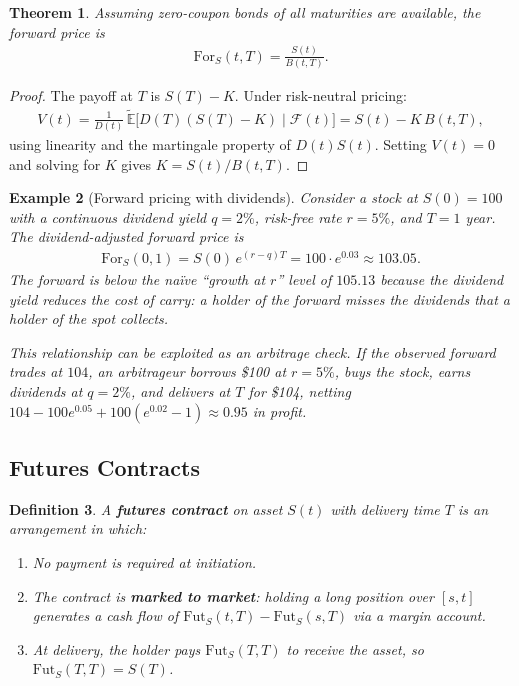\documentclass{report}
\theoremstyle{spacedplain}
\newtheorem{theorem}{Theorem}[section]
\theoremstyle{spaceddefinition}
\newtheorem{definition}[theorem]{Definition}
\newtheorem{example}[theorem]{Example}
\theoremstyle{spacedremark}
\begin{document}
\begin{theorem}
Assuming zero-coupon bonds of all maturities are available, the forward price is
\begin{align}
    \mathrm{For}_S(t,T) = \frac{S(t)}{B(t,T)}.
\end{align}
\end{theorem}

\begin{proof}
The payoff at $T$ is $S(T) - K$. Under risk-neutral pricing:
\begin{align}
    V(t) = \frac{1}{D(t)}\,\widetilde{\mathbb{E}}\bigl[D(T)(S(T)-K)\;\big|\;\mathcal{F}(t)\bigr] = S(t) - K\,B(t,T),
\end{align}
using linearity and the martingale property of $D(t)S(t)$. Setting $V(t) = 0$ and solving for $K$ gives $K = S(t)/B(t,T)$.
\end{proof}

\begin{example}[Forward pricing with dividends]
Consider a stock at $S(0) = 100$ with a continuous dividend yield $q = 2\%$, risk-free rate $r = 5\%$, and $T = 1$ year. The dividend-adjusted forward price is
\begin{align}
    \mathrm{For}_S(0,1) = S(0)\,e^{(r-q)T} = 100 \cdot e^{0.03} \approx 103.05.
\end{align}
The forward is below the na\"ive ``growth at $r$'' level of $105.13$ because the dividend yield reduces the cost of carry: a holder of the forward misses the dividends that a holder of the spot collects.

This relationship can be exploited as an arbitrage check. If the observed forward trades at $104$, an arbitrageur borrows \$100 at $r = 5\%$, buys the stock, earns dividends at $q = 2\%$, and delivers at $T$ for \$104, netting $104 - 100 e^{0.05} + 100(e^{0.02}-1) \approx 0.95$ in profit.
\end{example}


\subsection{Futures Contracts}

\begin{definition}
A \textbf{futures contract} on asset $S(t)$ with delivery time $T$ is an arrangement in which:
\begin{enumerate}
    \item No payment is required at initiation.
    \item The contract is \textbf{marked to market}: holding a long position over $[s,t]$ generates a cash flow of $\text{Fut}_S(t,T) - \text{Fut}_S(s,T)$ via a margin account.
    \item At delivery, the holder pays $\text{Fut}_S(T,T)$ to receive the asset, so $\text{Fut}_S(T,T) = S(T)$.
\end{enumerate}
\end{definition}
\end{document}
